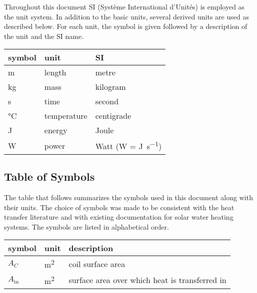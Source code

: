 \documentclass[12pt]{article}
\begin{document}
Throughout this document SI (Syst\`{e}me International d'Unit\'{e}s) is employed as the unit
system. In addition to the basic units, several derived units are used as described below. For each
unit, the symbol is given followed by a description of the unit and the SI name. ~\newline

\renewcommand{\arraystretch}{1.2}
\noindent \begin{tabular}{l l l}
	\toprule
	\textbf{symbol} & \textbf{unit} & \textbf{SI}                       \\
	\midrule
	\si{\metre}     & length        & metre                             \\
	\si{\kilogram}  & mass          & kilogram                          \\
	\si{\second}    & time          & second                            \\
	\si{\celsius}   & temperature   & centigrade                        \\
	\si{\joule}     & energy        & Joule                             \\
	\si{\watt}      & power         & Watt (W = \si{\joule\per\second}) \\
	\bottomrule
\end{tabular}


\subsection{Table of Symbols}

The table that follows summarizes the symbols used in this document along with their units. The
choice of symbols was made to be consistent with the heat transfer literature and with existing
documentation for solar water heating systems. The symbols are listed in alphabetical order.

\renewcommand{\arraystretch}{1.2}
\noindent \begin{longtable*}{l l p{12cm}} \toprule
	\textbf{symbol} & \textbf{unit} & \textbf{description}\\
	\midrule
	$A_C$ & \si[per-mode=symbol] {\square\metre} & coil surface area
	\\
	$A_\text{in}$ & \si[per-mode=symbol] {\square\metre} & surface area over
	which heat is transferred in
	\\
	\bottomrule
\end{longtable*}
\end{document}
